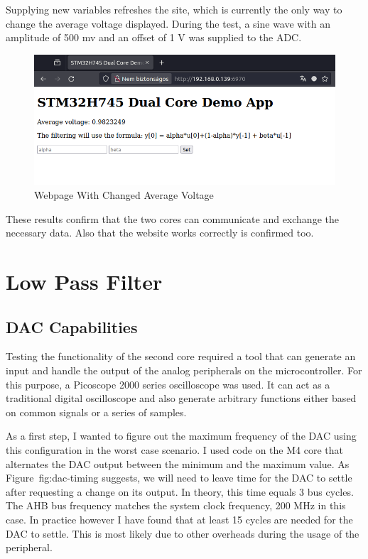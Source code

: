 Supplying new variables refreshes the site, which is currently the only way to change the average voltage displayed. During the test, a sine wave with an amplitude of 500 mv and an offset of 1 V was supplied to the ADC.

\begin{figure}[H]
    \centering
    \includegraphics[width=150mm, keepaspectratio]{figures/webpage-test2.png}
    \caption{Webpage With Changed Average Voltage}
    \label{fig:webpage-test2}
\end{figure}

These results confirm that the two cores can communicate and exchange the necessary data. Also that the website works correctly is confirmed too.

\section{Low Pass Filter}

\subsection{DAC Capabilities}

Testing the functionality of the second core required a tool that can generate an input and handle the output of the analog peripherals on the microcontroller. For this purpose, a Picoscope 2000 series oscilloscope was used. It can act as a traditional digital oscilloscope and also generate arbitrary functions either based on common signals or a series of samples.

As a first step, I wanted to figure out the maximum frequency of the DAC using this configuration in the worst case scenario. I used code on the M4 core that alternates the DAC output between the minimum and the maximum value. As Figure~{fig:dac-timing} suggests, we will need to leave time for the DAC to settle after requesting a change on its output. In theory, this time equals 3 bus cycles. The AHB bus frequency matches the system clock frequency, 200 MHz in this case. In practice however I have found that at least 15 cycles are needed for the DAC to settle. This is most likely due to other overheads during the usage of the peripheral.

